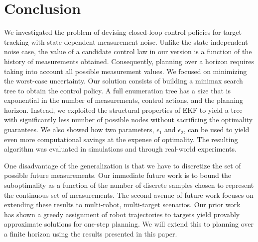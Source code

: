 \documentclass[journal]{IEEEtran}
\begin{document}
\section{Conclusion}\label{sec:conc}
We investigated the problem of devising closed-loop control policies for target tracking with state-dependent measurement noise. Unlike the state-independent noise case, the value of a candidate control law in our version is a function of the history of measurements obtained. Consequently, planning over a horizon requires taking into account all possible measurement values. 
We focused on minimizing the worst-case uncertainty. Our solution consists of building a minimax search tree to obtain the control policy. A full enumeration tree has a size that is exponential in the number of measurements, control actions, and the planning horizon. Instead, we exploited the structural properties of EKF to yield a tree with significantly less number of possible nodes without sacrificing the optimality guarantees. We also showed how two parameters, $\epsilon_1$ and $\epsilon_2$, can be used to yield even more computational savings at the expense of optimality. The resulting algorithm was evaluated in simulations and through real-world experiments.

One disadvantage of the generalization is that we have to discretize the set of possible future measurements. Our immediate future work is to bound the suboptimality as a function of the number of discrete samples chosen to represent the continuous set of  measurements. The second avenue of future work focuses on extending these results to multi-robot, multi-target scenarios. Our prior work~\cite{tokekar2014multi,sung2018distributed} has shown a greedy assignment of robot trajectories to targets yield provably approximate solutions for one-step planning. We will extend this to planning over a finite horizon using the results presented in this paper.
\end{document}

